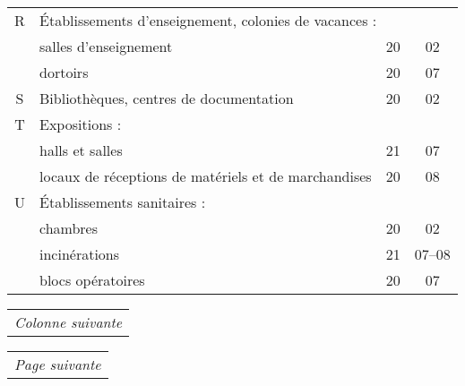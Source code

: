 \begin{minipage}[t]{0.49\linewidth}
\begin{tabularx}{\textwidth}[t]{c X c c}
R 	& \multicolumn{3}{p{0.75\textwidth}}{\'Etablissements d'enseignement, colonies de vacances :} \\
& salles	 d'enseignement																										& 20			& 02 \\
& dortoirs																																& 20			& 07 \\
S	&  Bibliothèques, centres de documentation																		& 20			& 02 \\
T 	& \multicolumn{3}{p{0.75\textwidth}}{Expositions :} \\
& halls et salles																														& 21			& 07 \\
& locaux de réceptions de matériels et de marchandises															& 20			& 08 \\
U 	& \multicolumn{3}{p{0.75\textwidth}}{\'Etablissements sanitaires :} \\
& chambres																															& 20			& 02 \\
& incinérations																														& 21			& 07--08 \\
& blocs opératoires																												& 20			& 07 \\
\end{tabularx}
\end{minipage}
\begin{minipage}[b]{0.49\textwidth}
\begin{xltabular}{\textwidth}{R}
\midrule
\small\textit{Colonne suivante} \\
\end{xltabular}
\end{minipage}
\hfill
\begin{minipage}[b]{0.49\textwidth}
\begin{xltabular}{\textwidth}{R}
\midrule
\small\textit{Page suivante} \\
\end{xltabular}
\end{minipage}
